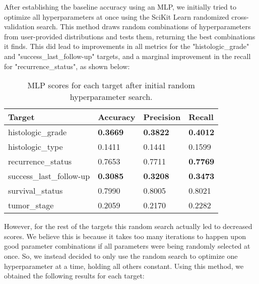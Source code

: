 \documentclass{article}
\begin{document}
After establishing the baseline accuracy using an MLP, we initially tried to optimize all hyperparameters at once using the SciKit Learn randomized cross-validation search. This method draws random combinations of hyperparameters from user-provided distributions and tests them, returning the best combinations it finds. This did lead to improvements in all metrics for the "histologic\_grade" and "success\_last\_follow-up" targets, and a marginal improvement in the recall for "recurrence\_status", as shown below:

\medskip

\begin{table}[H]
\begin{center}
\begin{tabular}{ *{4}{l} }
    \multicolumn{1}{p{1.5cm}}{\raggedright Target} &  
    \multicolumn{1}{p{1.5cm}}{\raggedright Accuracy} &  
    \multicolumn{1}{p{1.5cm}}{\raggedright Precision} &  
    \multicolumn{1}{p{1.5cm}}{\raggedright Recall} \\ \hline \hline
histologic\_grade       &              \textbf{0.3669} &               \textbf{0.3822} &            \textbf{0.4012} \\
histologic\_type        &              0.1411 &               0.1441 &            0.1599 \\
recurrence\_status      &              0.7653 &               0.7711 &            \textbf{0.7769} \\
success\_last\_follow-up &              \textbf{0.3085} &               \textbf{0.3208} &            \textbf{0.3473} \\
survival\_status        &              0.7990 &               0.8005 &            0.8021 \\
tumor\_stage            &              0.2059 &               0.2170 &            0.2282 \\
\end{tabular}
\caption{MLP scores for each target after initial random hyperparameter search.}
\end{center}
\end{table}

However, for the rest of the targets this random search actually led to decreased scores. We believe this is because it takes too many iterations to happen upon good parameter combinations if all parameters were being randomly selected at once. So, we instead decided to only use the random search to optimize one hyperparameter at a time, holding all others constant. Using this method, we obtained the following results for each target:
\end{document}
